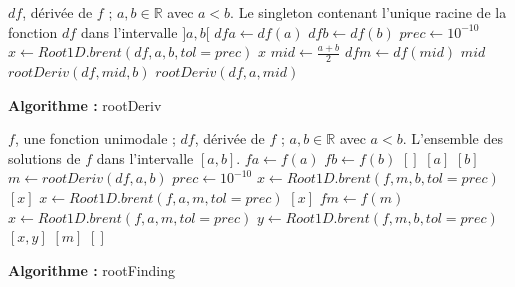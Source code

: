 \documentclass[a4paper, 12pt]{article}
\begin{document}
\begin{algorithm}

\begin{algorithmic}[1]

\REQUIRE \( df \), dérivée de \( f \) ; \( a, b  \in \mathbb{R} \) avec \( a < b \).
\ENSURE Le singleton contenant l'unique racine de la fonction \( df \) dans l'intervalle \( ]a, b[ \)
\STATE \( dfa \leftarrow df(a) \)
\STATE \( dfb \leftarrow df(b) \)
\STATE \( prec \leftarrow 10^{-10} \)
	\STATE \( x \leftarrow Root1D.brent(df, a, b, tol=prec) \)
	\RETURN $x$
\ELSE
	\STATE \( mid \leftarrow \frac{a + b}{2} \)
	\STATE \( dfm \leftarrow df(mid) \)
		\RETURN $mid$
		\RETURN \( rootDeriv(df, mid, b) \)
	\ELSE
		\RETURN \( rootDeriv(df, a, mid) \)
	\ENDIF
\ENDIF
\caption{\textbf{Algorithme : }rootDeriv}
\end{algorithmic}

\end{algorithm}%
\begin{algorithm}

\begin{algorithmic}[1]

\REQUIRE \( f \), une fonction unimodale ; \( df \), dérivée de \( f \) ; \( a, b  \in \mathbb{R} \) avec \( a < b \).
\ENSURE L'ensemble des solutions de \( f \) dans l'intervalle \( [a, b] \).
\STATE \( fa \leftarrow f(a) \)
\STATE \( fb \leftarrow f(b) \)
	\RETURN  $[]$
	\RETURN $[a]$
	\RETURN $[b]$
\ELSE
	\STATE \( m \leftarrow rootDeriv(df, a, b) \)
	\STATE \( prec \leftarrow 10^{-10}\)
		\STATE \( x \leftarrow Root1D.brent(f, m, b, tol=prec) \)
		\RETURN $[x]$
		\STATE \( x \leftarrow Root1D.brent(f, a, m, tol=prec) \)
		\RETURN $[x]$
	\ELSE
		\STATE \( fm \leftarrow f(m) \)
			\STATE \( x \leftarrow Root1D.brent(f, a, m, tol=prec) \)
			\STATE \( y \leftarrow Root1D.brent(f, m, b, tol=prec) \)
			\RETURN $[x, y]$
			\RETURN $[m]$
		\ELSE
			\RETURN $[]$
		\ENDIF
	\ENDIF
\ENDIF
\caption{\textbf{Algorithme : }rootFinding}
\end{algorithmic}

\end{algorithm}

\newpage
\end{document}
